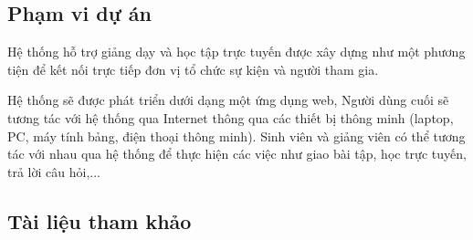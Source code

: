 \documentclass[./../main_file.tex]{subfiles}
\begin{document}
	\subsection{Phạm vi dự án}
	Hệ thống hỗ trợ giảng dạy và học tập trực tuyến được xây dựng như một phương tiện để kết nối trực tiếp đơn vị tổ chức sự kiện và người tham gia. 
	
	
	Hệ thống sẽ được phát triển dưới dạng một ứng dụng web, Người dùng cuối sẽ tương tác với hệ thống qua Internet thông qua các thiết bị thông minh (laptop, PC, máy tính bảng, điện thoại thông minh). Sinh viên và giảng viên có thể tương tác với nhau qua hệ thống để thực hiện các việc như giao bài tập, học trực tuyến, trả lời câu hỏi,...
	
	\subsection{Tài liệu tham khảo}
	\nocite{*}
	\printbibliography[heading=none]
	
\end{document}

